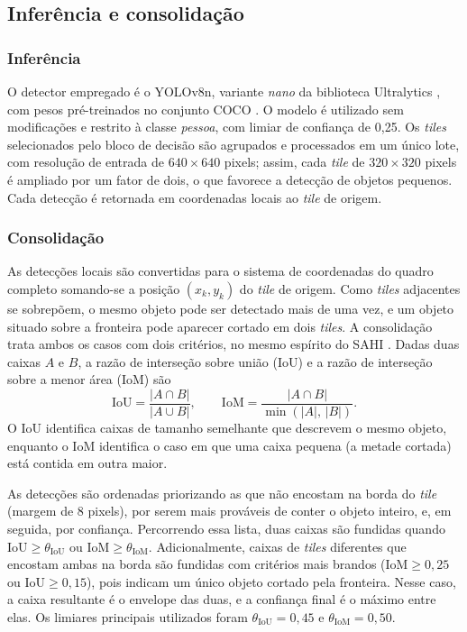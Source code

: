 \documentclass{ieeeaccess}
\begin{document}
\subsection{Inferência e consolidação}
\label{subsec:inferencia}

\subsubsection{Inferência}
O detector empregado é o YOLOv8n, variante \textit{nano} da biblioteca Ultralytics \cite{ultralytics}, com pesos pré-treinados no conjunto COCO \cite{lin2014coco}. O modelo é utilizado sem modificações e restrito à classe \textit{pessoa}, com limiar de confiança de 0,25. Os \textit{tiles} selecionados pelo bloco de decisão são agrupados e processados em um único lote, com resolução de entrada de $640\times640$ pixels; assim, cada \textit{tile} de $320\times320$ pixels é ampliado por um fator de dois, o que favorece a detecção de objetos pequenos. Cada detecção é retornada em coordenadas locais ao \textit{tile} de origem.

\subsubsection{Consolidação}
As detecções locais são convertidas para o sistema de coordenadas do quadro completo somando-se a posição $(x_k, y_k)$ do \textit{tile} de origem. Como \textit{tiles} adjacentes se sobrepõem, o mesmo objeto pode ser detectado mais de uma vez, e um objeto situado sobre a fronteira pode aparecer cortado em dois \textit{tiles}. A consolidação trata ambos os casos com dois critérios, no mesmo espírito do SAHI \cite{akyon2022sahi}. Dadas duas caixas $A$ e $B$, a razão de interseção sobre união (IoU) e a razão de interseção sobre a menor área (IoM) são
\begin{equation}
\mathrm{IoU} = \frac{|A \cap B|}{|A \cup B|}, \qquad
\mathrm{IoM} = \frac{|A \cap B|}{\min(|A|,\,|B|)}.
\label{eq:iou_iom}
\end{equation}
O IoU identifica caixas de tamanho semelhante que descrevem o mesmo objeto, enquanto o IoM identifica o caso em que uma caixa pequena (a metade cortada) está contida em outra maior.

As detecções são ordenadas priorizando as que não encostam na borda do \textit{tile} (margem de 8 pixels), por serem mais prováveis de conter o objeto inteiro, e, em seguida, por confiança. Percorrendo essa lista, duas caixas são fundidas quando $\mathrm{IoU} \ge \theta_{\mathrm{IoU}}$ ou $\mathrm{IoM} \ge \theta_{\mathrm{IoM}}$. Adicionalmente, caixas de \textit{tiles} diferentes que encostam ambas na borda são fundidas com critérios mais brandos ($\mathrm{IoM} \ge 0{,}25$ ou $\mathrm{IoU} \ge 0{,}15$), pois indicam um único objeto cortado pela fronteira. Nesse caso, a caixa resultante é o envelope das duas, e a confiança final é o máximo entre elas. Os limiares principais utilizados foram $\theta_{\mathrm{IoU}} = 0{,}45$ e $\theta_{\mathrm{IoM}} = 0{,}50$.
\end{document}
